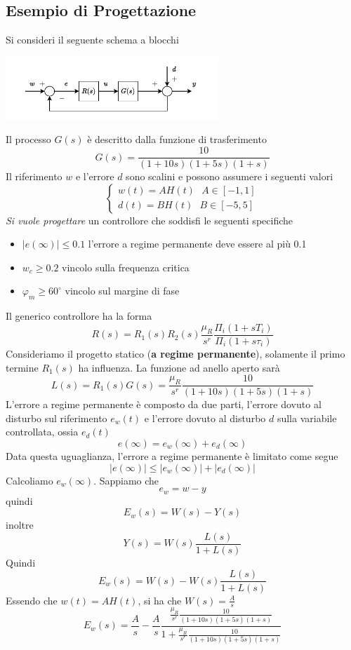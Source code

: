 \documentclass[10pt, letterpaper]{report}
\begin{document}
\subsection{Esempio di Progettazione}
Si consideri il seguente schema a blocchi
\begin{center}
    \includegraphics[width=0.6\textwidth ]{images/EsempioProgControllore1.pdf}
\end{center}
Il processo $G(s)$ è descritto dalla funzione di trasferimento 
$$ G(s)=\frac{10}{(1+10s)(1+5s)(1+s)}$$
Il riferimento $w$ e l'errore $d$ sono scalini e possono assumere i seguenti valori 
$$\begin{cases}
    w(t)=AH(t) \ \ \ A\in[-1,1]\\ 
    d(t)=BH(t) \ \ \ B\in[-5,5]
\end{cases} $$
\textit{Si vuole progettare} un controllore che soddisfi le seguenti specifiche\begin{itemize}
    \item $|e(\infty)|\le0.1$ l'errore a regime permanente deve essere al più 0.1 
    \item $w_c\ge 0.2$ vincolo sulla frequenza critica 
    \item $\varphi_m\ge 60^\circ$ vincolo sul margine di fase
\end{itemize}
Il generico controllore ha la forma 
$$ R(s)=R_1(s)R_2(s)\frac{\mu_R}{s^r}\frac{\Pi_i(1+sT_i)}{\Pi_i(1+s\tau_i)}$$
Consideriamo il progetto statico (\textbf{a regime permanente}), solamente il primo termine $R_1(s)$ ha influenza. La funzione ad anello aperto sarà 
$$ L(s)=R_1(s)G(s)=\frac{\mu_R}{s^r}\frac{10}{(1+10s)(1+5s)(1+s)}$$
L'errore a regime permanente è composto da due parti, l'errore dovuto al disturbo sul riferimento $e_w(t)$ e l'errore dovuto al disturbo $d$ sulla variabile controllata, ossia $e_d(t)$ 
$$ e(\infty)=e_w(\infty)+e_d(\infty)$$
Data questa uguaglianza, l'errore a regime permanente è limitato come segue 
$$ |e(\infty)|\le |e_w(\infty)|+ |e_d(\infty)|$$
Calcoliamo $e_w(\infty)$. Sappiamo che 
$$ e_w=w-y$$
quindi 
$$ E_w(s)=W(s)-Y(s)$$
inoltre
$$ Y(s)=W(s)\frac{L(s)}{1+L(s)}$$
Quindi 
$$ E_w(s)=W(s)-W(s)\frac{L(s)}{1+L(s)}$$
Essendo che $w(t)=AH(t)$, si ha che $W(s)=\frac{A}{s}$
$$ E_w(s)=\frac{A}{s}-\frac{A}{s}\frac{\frac{\mu_R}{s^r}\frac{10}{(1+10s)(1+5s)(1+s)}}{1+\frac{\mu_R}{s^r}\frac{10}{(1+10s)(1+5s)(1+s)}}$$
\end{document}
